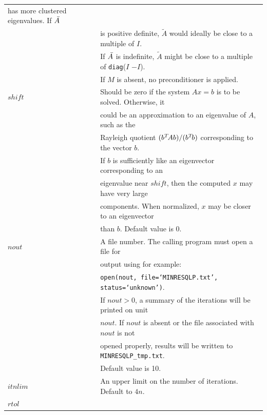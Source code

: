 \documentclass{doc_acmtrans2m}
\begin{document}
\begin{center}
\begin{longtable}{ll}
                   has more clustered eigenvalues. If $\Abar$  
\\               & is positive definite, $\tilde{A}$ 
                   would ideally be close to a multiple of $I$.
\\               & If $\Abar$ is indefinite, $\tilde{A}$ might be
                   close to a multiple of \texttt{diag}($I$ \; $-I$).
\\               & If $M$ is absent, no preconditioner is applied.
\\[2ex] $\mathit{shift}$ 
                 & Should be zero if the system $Ax = b$ is to be
                   solved. Otherwise, it
\\               & could be an approximation to an eigenvalue of $A$,
                   such as the
\\               & Rayleigh quotient $(b\T Ab) / (b\T b)$
                   corresponding to the vector $b$.
\\               & If $b$ is sufficiently like an eigenvector
                   corresponding to an
\\               & eigenvalue near $\mathit{shift}$, then the
                   computed $x$ may have very large
\\               & components. When normalized, $x$ may be closer to an eigenvector
\\               & than $b$. Default value is 0.
\\[2ex] $\mathit{nout}$ 
                 & A file number. The calling program must 
                   open a file for  
\\               & output using for example:  
\\               & \texttt{open(nout, file=`MINRESQLP.txt', status=`unknown')}. 
\\               & If $\mathit{nout} > 0$, 
                   a summary of the iterations will be printed on unit
\\               & $\mathit{nout}$. If $\mathit{nout}$ is absent
                   or the file associated with $\mathit{nout}$ is not
\\               & opened properly, results will be written to 
                   \texttt{MINRESQLP\_tmp.txt}.
\\               & Default value is 10.
\\[2ex] $\mathit{itnlim}$
                 & An upper limit on the number of iterations. 
                   Default to $4n$.
\\[2ex] $\mathit{rtol}$

\end{longtable}
\end{center}
\end{document}

